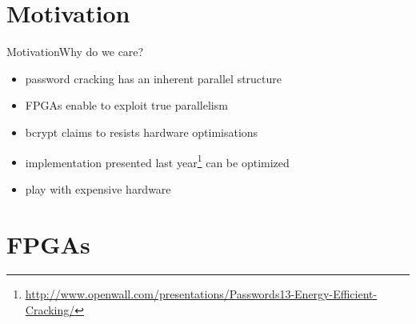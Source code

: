 
\section{Motivation}

\begin{frame}{Motivation}{Why do we care?}
    \begin{itemize}
        \item password cracking has an inherent parallel structure
        \item FPGAs enable to exploit true parallelism
    \end{itemize}
    \begin{itemize}
        \item bcrypt claims to resists hardware optimisations
        \item implementation presented last year\footnote{\tiny \url{http://www.openwall.com/presentations/Passwords13-Energy-Efficient-Cracking/}} can be optimized
    \end{itemize}
    \begin{itemize}
        \item play with expensive hardware
    \end{itemize}
\end{frame}

\section{FPGAs}

